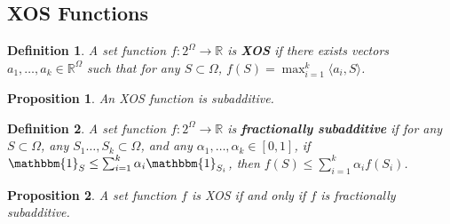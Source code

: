 \documentclass[openany]{book}
\newtheorem{definition}{Definition}[chapter]
\newtheorem{proposition}{Proposition}[chapter]
\theoremstyle{remark}
\begin{document}
\subsection{XOS Functions}
\begin{definition}
    A set function $f:2^{\Omega}\to \mathbb{R}$ is \textbf{XOS} if there exists vectors $a_1,\ldots,a_k\in \mathbb{R}^{\Omega}$ such that for any $S\subset\Omega$, $f(S)=\max_{i=1}^k \langle a_i,S\rangle$.
\end{definition}
\begin{proposition}
    An XOS function is subadditive.
\end{proposition}
\begin{definition}
    A set function $f:2^{\Omega}\to \mathbb{R}$ is \textbf{fractionally subadditive} if for any $S\subset\Omega$, any $S_1\ldots,S_k\subset\Omega$, and any $\alpha_1,\ldots,\alpha_k\in[0,1]$, if $\mathbbm{1}_S\le \sum_{i=1}^{k}\alpha_i\mathbbm{1}_{S_i}$, then $f(S)\le \sum_{i=1}^{k}\alpha_if(S_i)$.
\end{definition}
\begin{proposition}
    A set function $f$ is XOS if and only if $f$ is fractionally subadditive.
\end{proposition}
\end{document}
